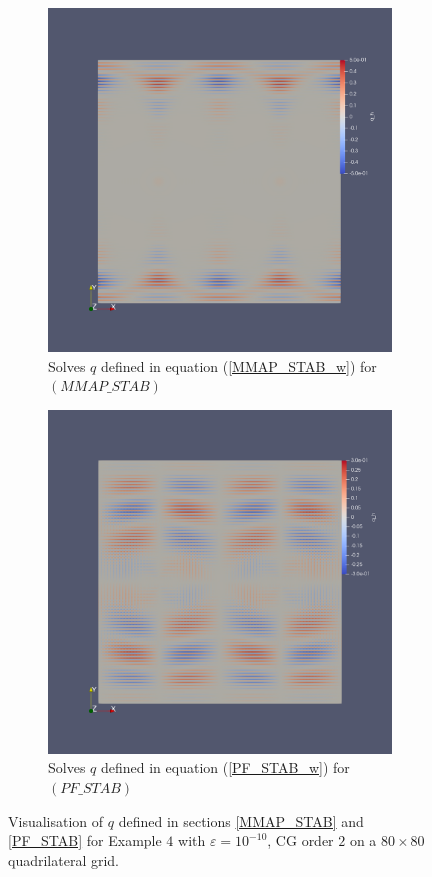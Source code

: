 \documentclass[12pt]{ociamthesis}
\begin{document}
\begin{figure}[H]
 \begin{subfigure}{0.5\textwidth}
     \includegraphics[width=\textwidth]{Pics/ErrorPlots/E4_MMAP_STAB_Q.png}
     \caption{Solves $q$ defined in equation (\ref{MMAP_STAB_w}) for $(MMAP\_STAB)$}
 \end{subfigure}
   \begin{subfigure}{0.5\textwidth}
     \includegraphics[width=\textwidth]{Pics/ErrorPlots/E4_PF_STAB_Q.png}
     \caption{Solves $q$ defined in equation (\ref{PF_STAB_w}) for $(PF\_STAB)$}
 \end{subfigure}
 \caption{Visualisation of $q$ defined in sections \ref{MMAP_STAB} and \ref{PF_STAB} for Example $4$ with $\varepsilon = 10^{-10}$, CG order $2$ on a $80 \times 80$ quadrilateral grid.} \label{E3_Q}
\end{figure}
\end{document}
